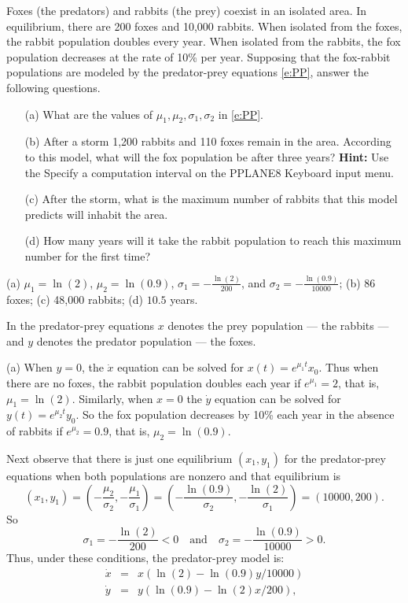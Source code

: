 \documentclass{ximera}
\begin{document}
\begin{exercise} \label{c9.1.8}
Foxes (the predators) and rabbits (the prey) coexist in an isolated area.
In equilibrium, there are 200 foxes and 10,000 rabbits.  When isolated from
the foxes, the rabbit population doubles every year.  When isolated from 
the rabbits, the fox population decreases at the rate of 10\% per year. 
Supposing that the fox-rabbit populations are modeled by the predator-prey
equations \eqref{e:PP}, answer the following questions.
\begin{itemize}
\item[(a)]  	What are the values of $\mu_1,\mu_2,\sigma_1,\sigma_2$ in 
\eqref{e:PP}.
\item[(b)]	After a storm 1,200 rabbits and 110 foxes remain in the area.
According to this model, what will the fox population be after three years?  
{\bf Hint:}  Use the {\sf Specify a computation interval} on the 
{\sf PPLANE8 Keyboard input} menu.
\item[(c)]	After the storm, what is the maximum number of rabbits that 
this model predicts will inhabit the area.
\item[(d)]	How many years will it take the rabbit population to reach 
this maximum number for the first time?
\end{itemize}

\begin{solution}

\ans (a) $\mu_1=\ln(2)$, $\mu_2=\ln(0.9)$, $\sigma_1 = -\frac{\ln(2)}{200}$,
and $\sigma_2 = -\frac{\ln(0.9)}{10000}$; (b) $86$ foxes; (c) 48,000 rabbits; 
(d) $10.5$ years.

\soln In the predator-prey equations $x$ denotes the prey population --- 
the rabbits --- and $y$ denotes the predator population --- the foxes.

\noindent (a) When $y=0$, the $\dot{x}$ equation can be solved for 
$x(t)=e^{\mu_1t}x_0$.  Thus when there are no foxes, the rabbit population 
doubles each year if $e^{\mu_1}=2$, that is, $\mu_1=\ln(2)$.  Similarly, when
$x=0$ the $\dot{y}$ equation can be solved for $y(t)=e^{\mu_2 t}y_0$.  So the
fox population decreases by 10\% each year in the absence of rabbits if 
$e^{\mu_2}=0.9$, that is, $\mu_2=\ln(0.9)$.

Next observe that there is just one equilibrium $(x_1,y_1)$ for the 
predator-prey equations when both populations are nonzero and that 
equilibrium is 
\[
(x_1,y_1) = \left(-\frac{\mu_2}{\sigma_2},-\frac{\mu_1}{\sigma_1}\right) = 
\left(-\frac{\ln(0.9)}{\sigma_2},-\frac{\ln(2)}{\sigma_1}\right) = 
(10000,200).
\]
So
\[
\sigma_1 = -\frac{\ln(2)}{200}<0 \quad \mbox{and} \quad
\sigma_2 = -\frac{\ln(0.9)}{10000}>0.
\]
Thus, under these conditions, the predator-prey model is:
\begin{equation}  \label{E:PPspec}
\begin{array}{rcl}
\dot{x} & = & x(\ln(2) - \ln(0.9)y/10000) \\
\dot{y} & = & y(\ln(0.9) - \ln(2)x/200),
\end{array}
\end{equation}


\end{solution}
\end{exercise}
\end{document}
